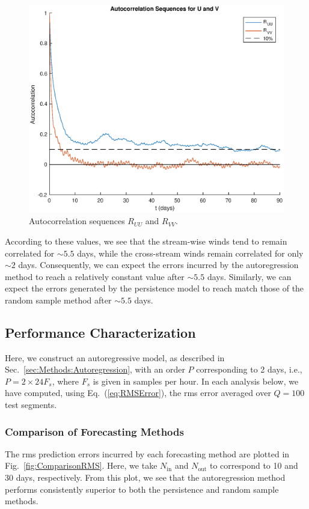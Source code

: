 \documentclass[11pt, oneside]{article}
\newcommand{\figref}[1]{Fig.~\ref{#1}}
\newcommand{\eqnref}[1]{Eq.~(\ref{#1})}
\newcommand{\secref}[1]{Sec.~\ref{#1}}
\begin{document}
\begin{figure}[htb]
\centering
\includegraphics[width=\columnwidth]{figures/AutocorrelationSequences_90days}
\caption{Autocorrelation sequences $R_{UU}$ and $R_{VV}$.}
\label{fig:Autocorrelations}
\end{figure}

According to these values, we see that the stream-wise winds tend to remain correlated for $\sim 5.5$ days, while the cross-stream winds remain correlated for only $\sim 2$ days.
Consequently, we can expect the errors incurred by the autoregression method to reach a relatively constant value after $\sim 5.5$ days.
Similarly, we can expect the errors generated by the persistence model to reach match those of the random sample method after $\sim 5.5$ days.

\subsection{Performance Characterization}
Here, we construct an autoregressive model, as described in \secref{sec:Methods:Autoregression}, with an order $P$ corresponding to 2 days, i.e., $P = 2 \times 24 F_s$, where $F_s$ is given in samples per hour.
In each analysis below, we have computed, using \eqnref{eq:RMSError}, the rms error averaged over $Q = 100$ test segments.

\subsubsection{Comparison of Forecasting Methods}\label{sec:Results:Comparison}
The rms prediction errors incurred by each forecasting method are plotted in \figref{fig:ComparisonRMS}.
Here, we take $N_\text{in}$ and $N_\text{out}$ to correspond to 10 and 30 days, respectively.
From this plot, we see that the autoregression method performs consistently superior to both the persistence and random sample methods.
\end{document}
